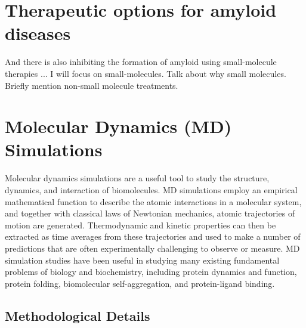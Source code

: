 \section{Therapeutic options for amyloid diseases}
\begin{outline}
	\1 And there is also inhibiting the formation of amyloid using small-molecule therapies ... I will focus on small-molecules.  Talk about why small molecules.
	\1 Briefly mention non-small molecule treatments.
\end{outline}

\section{Molecular Dynamics (MD) Simulations} %
\1 Molecular dynamics simulations are a useful tool to study the structure, dynamics, and interaction of biomolecules. MD simulations employ an empirical mathematical function to describe the atomic interactions in a molecular system, and together with classical laws of Newtonian mechanics, atomic trajectories of motion are generated. Thermodynamic and kinetic properties can then be extracted as time averages from these trajectories and used to make a number of predictions that are often experimentally challenging to observe or measure. 
\1 MD simulation studies have been useful in studying many existing fundamental problems of biology and biochemistry, including protein dynamics and function, protein folding, biomolecular self-aggregation, and protein-ligand binding.

\subsection{Methodological Details} %



